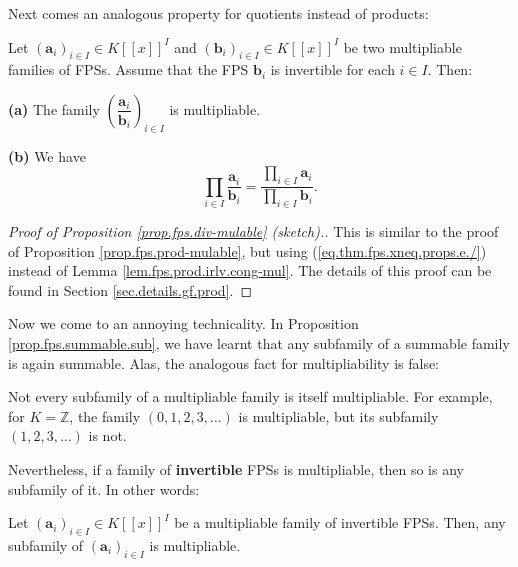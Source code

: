 Next comes an analogous property for quotients instead of products:

\begin{proposition}
\label{prop.fps.div-mulable}Let $\left(  \mathbf{a}_{i}\right)  _{i\in I}\in
K\left[  \left[  x\right]  \right]  ^{I}$ and $\left(  \mathbf{b}_{i}\right)
_{i\in I}\in K\left[  \left[  x\right]  \right]  ^{I}$ be two multipliable
families of FPSs. Assume that the FPS $\mathbf{b}_{i}$ is invertible for each
$i\in I$. Then: \medskip

\textbf{(a)} The family $\left(  \dfrac{\mathbf{a}_{i}}{\mathbf{b}_{i}%
}\right)  _{i\in I}$ is multipliable. \medskip

\textbf{(b)} We have%
\[
\prod_{i\in I}\dfrac{\mathbf{a}_{i}}{\mathbf{b}_{i}}=\dfrac{\prod\limits_{i\in
I}\mathbf{a}_{i}}{\prod\limits_{i\in I}\mathbf{b}_{i}}.
\]

\end{proposition}

\begin{proof}
[Proof of Proposition \ref{prop.fps.div-mulable} (sketch).]This is similar to
the proof of Proposition \ref{prop.fps.prod-mulable}, but using
(\ref{eq.thm.fps.xneq.props.e./}) instead of Lemma
\ref{lem.fps.prod.irlv.cong-mul}. The details of this proof can be found in
Section \ref{sec.details.gf.prod}.
\end{proof}

Now we come to an annoying technicality. In Proposition
\ref{prop.fps.summable.sub}, we have learnt that any subfamily of a summable
family is again summable. Alas, the analogous fact for multipliability is false:

\begin{remark}
\label{rmk.fps.subfamily-not-mulable}Not every subfamily of a multipliable
family is itself multipliable. For example, for $K=\mathbb{Z}$, the family
$\left(  0,1,2,3,\ldots\right)  $ is multipliable, but its subfamily $\left(
1,2,3,\ldots\right)  $ is not.
\end{remark}

Nevertheless, if a family of \textbf{invertible} FPSs is multipliable, then so
is any subfamily of it. In other words:

\begin{proposition}
\label{prop.fps.prods-mulable-subfams}Let $\left(  \mathbf{a}_{i}\right)
_{i\in I}\in K\left[  \left[  x\right]  \right]  ^{I}$ be a multipliable
family of invertible FPSs. Then, any subfamily of $\left(  \mathbf{a}%
_{i}\right)  _{i\in I}$ is multipliable.
\end{proposition}

